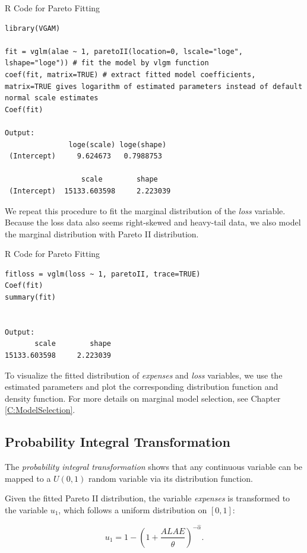 \documentclass[]{book}
\theoremstyle{definition}
\theoremstyle{definition}
\theoremstyle{definition}
\theoremstyle{remark}
\begin{document}
R Code for Pareto Fitting

\hypertarget{display.Reg.2}{}
\begin{verbatim}
library(VGAM)

fit = vglm(alae ~ 1, paretoII(location=0, lscale="loge", lshape="loge")) # fit the model by vlgm function
coef(fit, matrix=TRUE) # extract fitted model coefficients, matrix=TRUE gives logarithm of estimated parameters instead of default normal scale estimates
Coef(fit)

Output: 
               loge(scale) loge(shape)
 (Intercept)     9.624673   0.7988753
 
                  scale        shape 
 (Intercept)  15133.603598     2.223039 
\end{verbatim}

We repeat this procedure to fit the marginal distribution of the
\emph{loss} variable. Because the loss data also seems right-skewed and
heavy-tail data, we also model the marginal distribution with Pareto II
distribution.

R Code for Pareto Fitting

\hypertarget{display.ParFit.2}{}
\begin{verbatim}
fitloss = vglm(loss ~ 1, paretoII, trace=TRUE)
Coef(fit)
summary(fit)


Output: 
       scale        shape 
15133.603598     2.223039 
\end{verbatim}

To visualize the fitted distribution of \emph{expenses } and \emph{loss}
variables, we use the estimated parameters and plot the corresponding
distribution function and density function. For more details on marginal
model selection, see Chapter \ref{C:ModelSelection}.

\subsection{Probability Integral
Transformation}\label{probability-integral-transformation}

The \emph{probability integral transformation } shows that any
continuous variable can be mapped to a \(U(0,1)\) random variable via
its distribution function.

Given the fitted Pareto II distribution, the variable \emph{expenses} is
transformed to the variable \(u_1\), which follows a uniform
distribution on \([0,1]\):

\[u_1 = 1 - \left( 1 + \frac{ALAE}{\hat{\theta}} \right)^{-\hat{\alpha}}.\]
\end{document}
